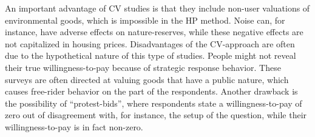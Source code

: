 \documentclass[a4paper]{scrartcl}
\begin{document}
An important advantage of CV studies is that they include non-user valuations of environmental goods, which is impossible in the HP method. Noise can, for instance, have adverse effects on nature-reserves, while these negative effects are not capitalized in housing prices. Disadvantages of the CV-approach are often due to the hypothetical nature of this type of studies. People might not reveal their true willingness-to-pay because of strategic response behavior. These surveys are often directed at valuing goods that have a public nature, which causes free-rider behavior on the part of the respondents. Another drawback is the possibility of “protest-bids”, where respondents state a willingness-to-pay of zero out of disagreement with, for instance, the setup of the question, while their willingness-to-pay is in fact non-zero.




\end{document}
